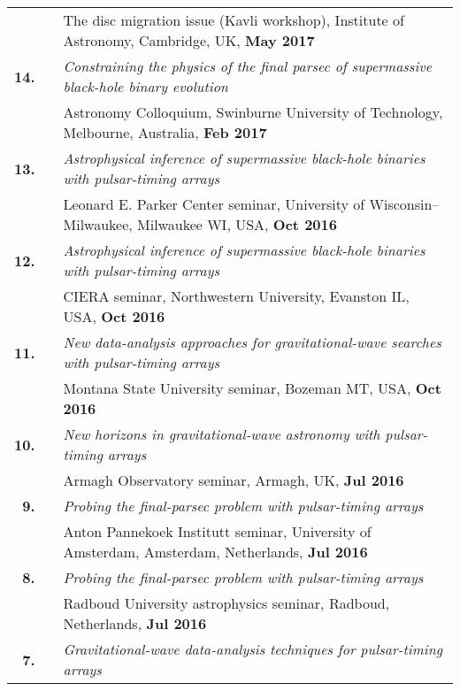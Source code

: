 \documentclass[11pt,letterpaper,sans]{moderncv}
\begin{document}
{\begin{longtable}{rp{0.3cm}p{15.8cm}}
&& The disc migration issue (Kavli workshop), Institute of Astronomy, Cambridge, UK, \textbf{May 2017} \vspace{0.09cm}\\
\textbf{14.} & & \textit{Constraining the physics of the final parsec of supermassive black-hole binary evolution} \\ 
&& Astronomy Colloquium, Swinburne University of Technology, Melbourne, Australia, \textbf{Feb 2017} \vspace{0.09cm}\\
\textbf{13.} & & \textit{Astrophysical inference of supermassive black-hole binaries with pulsar-timing arrays} \\ 
&& Leonard E. Parker Center seminar, University of Wisconsin--Milwaukee, Milwaukee WI, USA, \textbf{Oct 2016} \vspace{0.09cm}\\
\textbf{12.} & & \textit{Astrophysical inference of supermassive black-hole binaries with pulsar-timing arrays} \\ 
&& CIERA seminar, Northwestern University, Evanston IL, USA, \textbf{Oct 2016} \vspace{0.09cm}\\
\textbf{11.} & & \textit{New data-analysis approaches for gravitational-wave searches with pulsar-timing arrays} \\ 
&& Montana State University seminar, Bozeman MT, USA, \textbf{Oct 2016} \vspace{0.09cm}\\
\textbf{10.} & & \textit{New horizons in gravitational-wave astronomy with pulsar-timing arrays} \\ 
&& Armagh Observatory seminar, Armagh, UK, \textbf{Jul 2016} \vspace{0.09cm}\\
\textbf{9.} & & \textit{Probing the final-parsec problem with pulsar-timing arrays} \\ 
&& Anton Pannekoek Institutt seminar, University of Amsterdam, Amsterdam, Netherlands, \textbf{Jul 2016} \vspace{0.09cm}\\
\textbf{8.} & & \textit{Probing the final-parsec problem with pulsar-timing arrays} \\ 
&& Radboud University astrophysics seminar, Radboud, Netherlands, \textbf{Jul 2016} \vspace{0.09cm}\\
\textbf{7.} & & \textit{Gravitational-wave data-analysis techniques for pulsar-timing arrays} \\ 

\end{longtable}}
\end{document}
